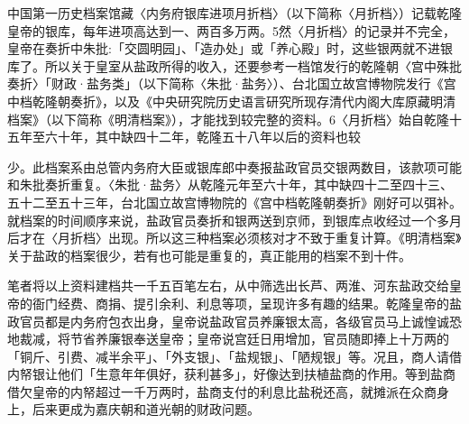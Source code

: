 中国第一历史档案馆藏〈内务府银库进项月折档〉（以下简称〈月折档〉）记载乾隆皇帝的银库，每年进项高达到一、两百多万两。5然〈月折档〉的记录并不完全，皇帝在奏折中朱批:「交圆明园」、「造办处」或「养心殿」时，这些银两就不进银库了。所以关于皇室从盐政所得的收入，还要参考一档馆发行的乾隆朝〈宫中殊批奏折〉「财政·盐务类」（以下简称〈朱批·盐务〉）、台北国立故宫博物院发行《宫中档乾隆朝奏折》，以及《中央研究院历史语言研究所现存清代内阁大库原藏明清档案》（以下简称《明清档案》），才能找到较完整的资料。6〈月折档〉始自乾隆十五年至六十年，其中缺四十二年，乾隆五十八年以后的资料也较

\vfill
\begin{BookNotes}
\end{BookNotes}

\noindent 少。此档案系由总管内务府大臣或银库郎中奏报盐政官员交银两数目，该款项可能和朱批奏折重复。〈朱批·盐务〉从乾隆元年至六十年，其中缺四十二至四十三、五十二至五十三年，台北国立故宫博物院的《宫中档乾隆朝奏折》刚好可以弭补。就档案的时间顺序来说，盐政官员奏折和银两送到京师，到银库点收经过一个多月后才在〈月折档〉出现。所以这三种档案必须核对才不致于重复计算。《明清档案》关于盐政的档案很少，若有也可能是重复的，真正能用的档案不到十件。

笔者将以上资料建档共一千五百笔左右，从中筛选出长芦、两淮、河东盐政交给皇帝的衙门经费、商捐、提引余利、利息等项，呈现许多有趣的结果。乾隆皇帝的盐政官员都是内务府包衣出身，皇帝说盐政官员养廉银太高，各级官员马上诚惶诚恐地裁减，将节省养廉银奉送皇帝；皇帝说宫廷日用增加，官员随即捧上十万两的「铜斤、引费、减半余平」、「外支银」、「盐规银」、「陋规银」等。况且，商人请借内帑银让他们「生意年年俱好，获利甚多」，好像达到扶植盐商的作用。等到盐商借欠皇帝的内帑超过一千万两时，盐商支付的利息比盐税还高，就摊派在众商身上，后来更成为嘉庆朝和道光朝的财政问题。

